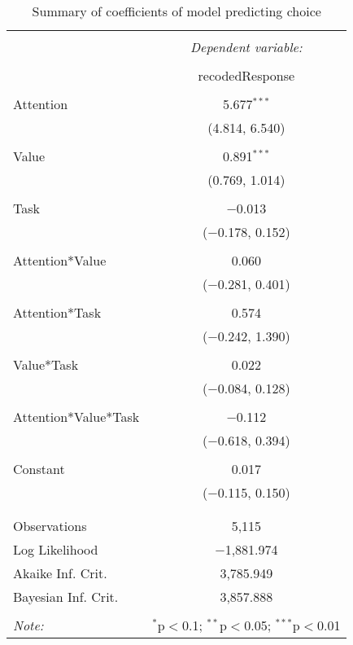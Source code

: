 
\begin{table}[!htbp] \centering 
  \caption{Summary of coefficients of model predicting choice} 
  \label{} 
\begin{tabular}{@{\extracolsep{5pt}}lc} 
\\[-1.8ex]\hline 
\hline \\[-1.8ex] 
 & \multicolumn{1}{c}{\textit{Dependent variable:}} \\ 
\cline{2-2} 
\\[-1.8ex] & recodedResponse \\ 
\hline \\[-1.8ex] 
 Attention & 5.677$^{***}$ \\ 
  & (4.814, 6.540) \\ 
  & \\ 
 Value & 0.891$^{***}$ \\ 
  & (0.769, 1.014) \\ 
  & \\ 
 Task & $-$0.013 \\ 
  & ($-$0.178, 0.152) \\ 
  & \\ 
 Attention*Value & 0.060 \\ 
  & ($-$0.281, 0.401) \\ 
  & \\ 
 Attention*Task & 0.574 \\ 
  & ($-$0.242, 1.390) \\ 
  & \\ 
 Value*Task & 0.022 \\ 
  & ($-$0.084, 0.128) \\ 
  & \\ 
 Attention*Value*Task & $-$0.112 \\ 
  & ($-$0.618, 0.394) \\ 
  & \\ 
 Constant & 0.017 \\ 
  & ($-$0.115, 0.150) \\ 
  & \\ 
\hline \\[-1.8ex] 
Observations & 5,115 \\ 
Log Likelihood & $-$1,881.974 \\ 
Akaike Inf. Crit. & 3,785.949 \\ 
Bayesian Inf. Crit. & 3,857.888 \\ 
\hline 
\hline \\[-1.8ex] 
\textit{Note:}  & \multicolumn{1}{r}{$^{*}$p$<$0.1; $^{**}$p$<$0.05; $^{***}$p$<$0.01} \\ 
\end{tabular} 
\end{table} 
